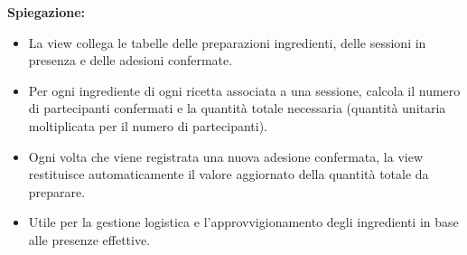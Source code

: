 \textbf{Spiegazione:}
\begin{itemize}
    \item La view collega le tabelle delle preparazioni ingredienti, delle sessioni in presenza e delle adesioni confermate.
    \item Per ogni ingrediente di ogni ricetta associata a una sessione, calcola il numero di partecipanti confermati e la quantità totale necessaria (quantità unitaria moltiplicata per il numero di partecipanti).
    \item Ogni volta che viene registrata una nuova adesione confermata, la view restituisce automaticamente il valore aggiornato della quantità totale da preparare.
    \item Utile per la gestione logistica e l'approvvigionamento degli ingredienti in base alle presenze effettive.
\end{itemize}